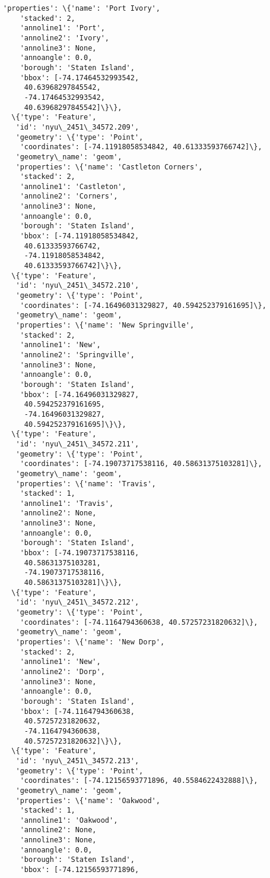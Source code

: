 \documentclass[11pt]{article}
\begin{document}
\begin{tcolorbox}[breakable, size=fbox, boxrule=.5pt, pad at break*=1mm, opacityfill=0]
\begin{Verbatim}[commandchars=\\\{\}]
   'properties': \{'name': 'Port Ivory',
    'stacked': 2,
    'annoline1': 'Port',
    'annoline2': 'Ivory',
    'annoline3': None,
    'annoangle': 0.0,
    'borough': 'Staten Island',
    'bbox': [-74.17464532993542,
     40.63968297845542,
     -74.17464532993542,
     40.63968297845542]\}\},
  \{'type': 'Feature',
   'id': 'nyu\_2451\_34572.209',
   'geometry': \{'type': 'Point',
    'coordinates': [-74.11918058534842, 40.61333593766742]\},
   'geometry\_name': 'geom',
   'properties': \{'name': 'Castleton Corners',
    'stacked': 2,
    'annoline1': 'Castleton',
    'annoline2': 'Corners',
    'annoline3': None,
    'annoangle': 0.0,
    'borough': 'Staten Island',
    'bbox': [-74.11918058534842,
     40.61333593766742,
     -74.11918058534842,
     40.61333593766742]\}\},
  \{'type': 'Feature',
   'id': 'nyu\_2451\_34572.210',
   'geometry': \{'type': 'Point',
    'coordinates': [-74.16496031329827, 40.594252379161695]\},
   'geometry\_name': 'geom',
   'properties': \{'name': 'New Springville',
    'stacked': 2,
    'annoline1': 'New',
    'annoline2': 'Springville',
    'annoline3': None,
    'annoangle': 0.0,
    'borough': 'Staten Island',
    'bbox': [-74.16496031329827,
     40.594252379161695,
     -74.16496031329827,
     40.594252379161695]\}\},
  \{'type': 'Feature',
   'id': 'nyu\_2451\_34572.211',
   'geometry': \{'type': 'Point',
    'coordinates': [-74.19073717538116, 40.58631375103281]\},
   'geometry\_name': 'geom',
   'properties': \{'name': 'Travis',
    'stacked': 1,
    'annoline1': 'Travis',
    'annoline2': None,
    'annoline3': None,
    'annoangle': 0.0,
    'borough': 'Staten Island',
    'bbox': [-74.19073717538116,
     40.58631375103281,
     -74.19073717538116,
     40.58631375103281]\}\},
  \{'type': 'Feature',
   'id': 'nyu\_2451\_34572.212',
   'geometry': \{'type': 'Point',
    'coordinates': [-74.1164794360638, 40.57257231820632]\},
   'geometry\_name': 'geom',
   'properties': \{'name': 'New Dorp',
    'stacked': 2,
    'annoline1': 'New',
    'annoline2': 'Dorp',
    'annoline3': None,
    'annoangle': 0.0,
    'borough': 'Staten Island',
    'bbox': [-74.1164794360638,
     40.57257231820632,
     -74.1164794360638,
     40.57257231820632]\}\},
  \{'type': 'Feature',
   'id': 'nyu\_2451\_34572.213',
   'geometry': \{'type': 'Point',
    'coordinates': [-74.12156593771896, 40.5584622432888]\},
   'geometry\_name': 'geom',
   'properties': \{'name': 'Oakwood',
    'stacked': 1,
    'annoline1': 'Oakwood',
    'annoline2': None,
    'annoline3': None,
    'annoangle': 0.0,
    'borough': 'Staten Island',
    'bbox': [-74.12156593771896,

\end{Verbatim}
\end{tcolorbox}
\end{document}
